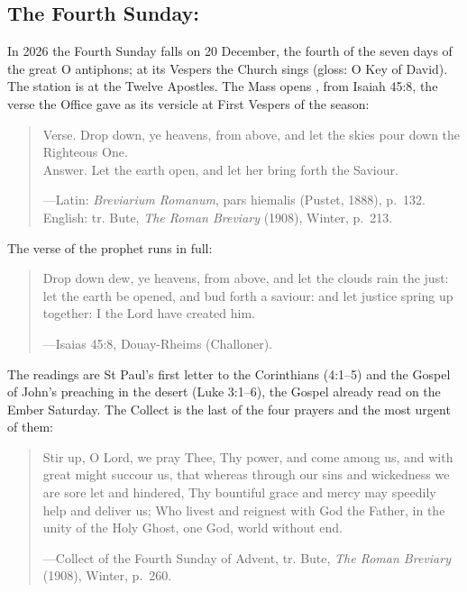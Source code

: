 \subsection{The Fourth Sunday: }\label{sec:fourth-sunday}

In 2026 the Fourth Sunday falls on 20 December, the fourth of the seven days of the great O
antiphons; at its Vespers the Church sings  (gloss: O Key of David). The
station is at the Twelve Apostles. The Mass opens , from Isaiah 45:8, the verse
the Office gave as its versicle at First Vespers of the season:

\begin{quote}
\par
\smallskip
Verse. Drop down, ye heavens, from above, and let the skies pour down the Righteous One.\\
Answer. Let the earth open, and let her bring forth the Saviour.\par
{\smallskip\noindent\small ---Latin: \textit{Breviarium Romanum}, pars hiemalis (Pustet, 1888),
p.~132. English: tr. Bute, \textit{The Roman Breviary} (1908), Winter, p.~213.\par}
\end{quote}

\noindent The verse of the prophet runs in full:

\begin{quote}
Drop down dew, ye heavens, from above, and let the clouds rain the just: let the earth be opened,
and bud forth a saviour: and let justice spring up together: I the Lord have created him.\par
{\smallskip\noindent\small ---Isaias 45:8, Douay-Rheims (Challoner).\par}
\end{quote}

The readings are St Paul's first letter to the Corinthians (4:1--5) and the Gospel of John's
preaching in the desert (Luke 3:1--6), the Gospel already read on the Ember Saturday. The Collect
is the last of the four  prayers and the most urgent of them:

\begin{quote}
Stir up, O Lord, we pray Thee, Thy power, and come among us, and with great might succour us, that
whereas through our sins and wickedness we are sore let and hindered, Thy bountiful grace and mercy
may speedily help and deliver us; Who livest and reignest with God the Father, in the unity of the
Holy Ghost, one God, world without end.\par
{\smallskip\noindent\small ---Collect of the Fourth Sunday of Advent, tr. Bute, \textit{The Roman
Breviary} (1908), Winter, p.~260.\par}
\end{quote}

